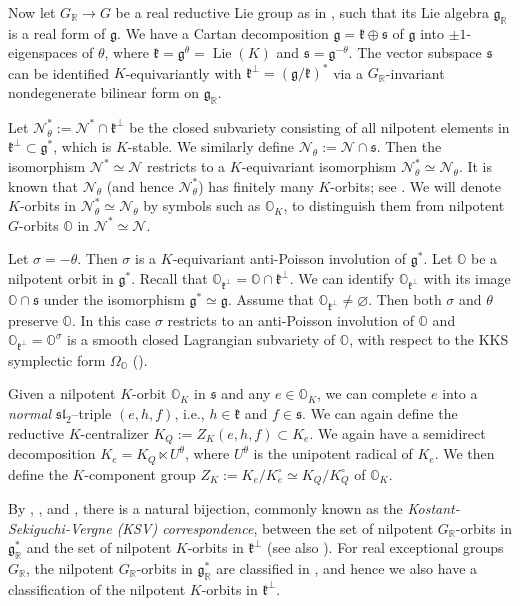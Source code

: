 \documentclass[11pt, a4paper]{amsart}
\newcommand{\g}{\mathfrak{g}}
\newcommand{\orb}{\mathbb{O}}
\newcommand{\orbk}{\orb_{K}}
\newcommand{\fk}{\mathfrak{k}}
\newcommand{\fs}{\mathfrak{s}}
\newcommand{\cN}{\mathcal{N}}
\DeclareMathOperator{\Lie}{Lie}
\DeclareMathOperator{\Ad}{Ad}
\newcommand{\R}{\mathbb{R}}
\newcommand{\GR}{G_\R}
\newcommand{\slf}{\mathfrak{sl}}
\theoremstyle{definition}
\numberwithin{equation}{section}
\begin{document}
Now let $\GR \to G$ be a real reductive Lie group as in , such that its Lie algebra $\g_\R$ is a real form of $\g$. We have a Cartan decomposition $\g = \fk \oplus \fs$ of $\g$ into $\pm 1$-eigenspaces of $\theta$, where $\fk = \g^\theta = \Lie(K)$ and $\fs = \g^{-\theta}$. The vector subspace $\fs$ can be identified $K$-equivariantly with $\fk^\perp = (\g/\fk)^*$ via a $\GR$-invariant nondegenerate bilinear form on $\g_\R$. %

Let $\cN_\theta^*:=\cN^* \cap \fk^\perp$ be the closed subvariety consisting of all nilpotent elements in $\fk^\perp \subset \g^*$, which is $K$-stable. We similarly define $\cN_\theta := \cN \cap \fs$. Then the isomorphism $\cN^* \simeq \cN$ restricts to a $K$-equivariant isomorphism $\cN^*_\theta \simeq \cN_\theta$. It is known that $\cN_\theta$ (and hence $\cN^*_\theta$) has finitely many $K$-orbits; see \cite{KostantRallis}. We will denote $K$-orbits in $\cN_\theta^* \simeq \cN_\theta$ by symbols such as $\orbk$, to distinguish them from nilpotent $G$-orbits $\orb$ in $\cN^* \simeq \cN$.

Let $\sigma = -\theta$. Then $\sigma$ is a $K$-equivariant anti-Poisson involution of $\g^*$. Let $\orb$ be a nilpotent orbit in $\g^*$. Recall that $\orb_{\fk^\perp} = \orb \cap \fk^\perp$. We can identify $\orb_{\fk^\perp}$ with its image $\orb \cap \fs$ under the isomorphism $\g^* \simeq \g$. Assume that $\orb_{\fk^\perp} \neq \varnothing$. Then both $\sigma$ and $\theta$ preserve $\orb$. In this case $\sigma$ restricts to an anti-Poisson involution of $\orb$ and $\orb_{\fk^\perp} = \orb^{\sigma}$ is a smooth closed Lagrangian subvariety of $\orb$, with respect to the KKS symplectic form $\Omega_\orb$ (\cite[Corollary 5.20]{Vogan_AV}).

Given a nilpotent $K$-orbit $\orbk$ in $\fs$ and any $e \in \orbk$, we can complete $e$ into a \emph{normal} $\slf_2$–triple $(e,h,f)$, i.e., $h \in \fk$ and $f \in \fs$. We can again define the reductive $K$-centralizer $K_Q:=Z_K(e,h,f) \subset K_e$. 
We again have a semidirect decomposition $K_e = K_Q \ltimes U^\theta$, where $U^\theta$ is the unipotent radical of $K_e$. We then define the $K$-component group $Z_K:=K_e/K_e^\circ \simeq K_Q/K_Q^\circ$ of $\orbk$.

By \cite{Sekiguchi:bijection}, \cite{Djokovic:bijection}, and \cite{Vergne}, there is a natural bijection, commonly known as the \emph{Kostant-Sekiguchi-Vergne (KSV) correspondence}, between the set of nilpotent $\GR$-orbits in $\g_\R^*$ and the set of nilpotent $K$-orbits in $\fk^\perp$ (see also \cite[Section 9.5]{CM}). 
For real exceptional groups $\GR$, the nilpotent $\GR$-orbits in $\g_\R^*$ are classified in \cite{Djokovic:centralizer_inner, Djokovic:centralizer_outer}, and hence we also have a classification of the nilpotent $K$-orbits in $\fk^\perp$.
\end{document}
